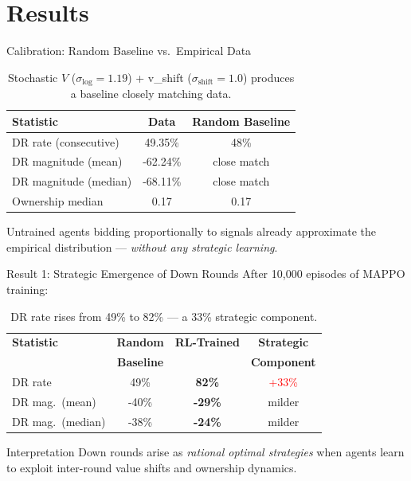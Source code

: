 \documentclass[aspectratio=169]{beamer}
\begin{document}
\section{Results}

\begin{frame}{Calibration: Random Baseline vs.~Empirical Data}
  \begin{table}
    \centering
    \caption{Stochastic $V$ ($\sigma_{\log}=1.19$) + v\_shift ($\sigma_{\text{shift}}=1.0$) produces a baseline closely matching data.}
    \begin{tabular}{lcc}
      \toprule
      \textbf{Statistic} & \textbf{Data} & \textbf{Random Baseline} \\
      \midrule
      DR rate (consecutive) & 49.35\% & 48\% \\
      DR magnitude (mean)   & -62.24\% & close match \\
      DR magnitude (median) & -68.11\% & close match \\
      Ownership median      & 0.17     & 0.17 \\
      \bottomrule
    \end{tabular}
  \end{table}

  \vspace{0.3cm}
  Untrained agents bidding proportionally to signals already approximate the empirical distribution --- \emph{without any strategic learning}.
\end{frame}

\begin{frame}{Result 1: Strategic Emergence of Down Rounds}
  After 10,000 episodes of MAPPO training:

  \begin{table}
    \centering
    \caption{DR rate rises from 49\% to 82\% --- a 33\% strategic component.}
    \begin{tabular}{lccc}
      \toprule
      \textbf{Statistic} & \textbf{Random} & \textbf{RL-Trained} & \textbf{Strategic} \\
      & \textbf{Baseline} & & \textbf{Component} \\
      \midrule
      DR rate & 49\% & \textbf{82\%} & \textcolor{red}{+33\%} \\
      DR mag.\ (mean) & -40\% & \textbf{-29\%} & milder \\
      DR mag.\ (median) & -38\% & \textbf{-24\%} & milder \\
      \bottomrule
    \end{tabular}
  \end{table}

  \vspace{0.3cm}
  \begin{block}{Interpretation}
    Down rounds arise as \emph{rational optimal strategies} when agents learn to exploit inter-round value shifts and ownership dynamics.
  \end{block}
\end{frame}
\end{document}
